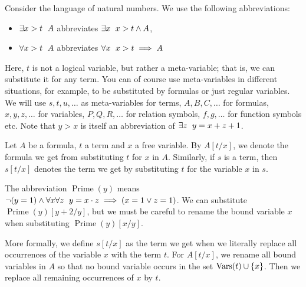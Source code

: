 
Consider the language of natural numbers.
We use the following abbreviations:
\begin{itemize}
\item $\exists x > t \;\  A$ abbreviates $\exists x \;\  x > t \land A$,
\item $\forall x > t \;\  A$ abbreviates $\forall x \;\  x > t \implies A$
\end{itemize}
Here, $t$ is not a logical variable, but rather a meta-variable; that is, we can
substitute it for any term.
You can of course use meta-variables in different situations, for example, to be
substituted by formulas or just regular variables.
We will use $s, t, u, \ldots$ as meta-variables for terms, $A, B, C, \ldots$ for
formulas, $x, y, z, \ldots$ for variables, $P, Q, R, \ldots$ for relation
symbols, $f, g, \ldots$ for function symbols etc.
Note that $y > x$ is itself an abbreviation of $\exists z \;\  y = x+z+1$.

Let $A$ be a formula, $t$ a term and $x$ a free variable.
By $A[t/x]$, we denote the formula we get from substituting $t$ for $x$
in $A$.
Similarly, if $s$ is a term, then $s[t/x]$ denotes the term we get by
substituting $t$ for the variable $x$ in $s$.

\begin{example}
  The abbreviation $\operatorname{Prime}(y)$ means $\lnot(y=1) \land \forall x
  \forall z \;\  y = x \cdot z \implies (x = 1 \lor z = 1)$.
  We can substitute $\operatorname{Prime}(y)[y+2/y]$, but we must be careful
  to rename the bound variable $x$ when substituting
  $\operatorname{Prime}(y)[x/y]$.
\end{example}

More formally, we define $s[t/x]$ as the term we get when we literally replace
all occurrences of the variable $x$ with the term $t$.
For $A[t/x]$, we rename all bound variables in $A$ so that no bound
variable occurs in the set $\operatorname{Vars}(t) \cup \{x\}$.
Then we replace all remaining occurrences of $x$ by $t$.

